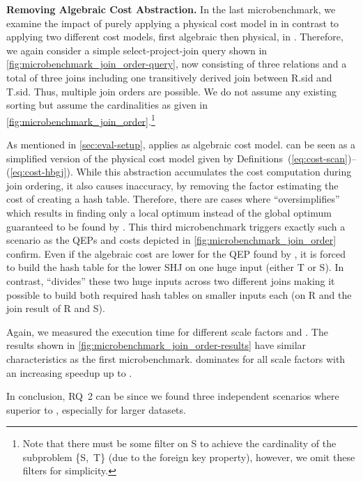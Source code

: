 \textbf{Removing Algebraic Cost Abstraction.}
In the last microbenchmark, we examine the impact of purely applying a physical cost model in \holistic in contrast to applying two different cost models, \ie first algebraic then physical, in \split.  Therefore, we again consider a simple select-project-join query shown in \autoref{fig:microbenchmark_join_order-query}, now consisting of three relations and a total of three joins including one transitively derived join between R.sid and T.sid.  Thus, multiple join orders are possible.  We do not assume any existing sorting but assume the cardinalities as given in \autoref{fig:microbenchmark_join_order}.\footnote{Note that there must be some filter on S to achieve the cardinality of the subproblem \{S,~T\} (due to the foreign key property), however, we omit these filters for simplicity.}

As mentioned in \autoref{sec:eval-setup}, \split applies \Cout as algebraic cost model.  \Cout can be seen as a simplified version of the physical cost model given by Definitions~(\ref{eq:cost-scan})--(\ref{eq:cost-hbgj}).  While this abstraction accumulates the cost computation during join ordering, it also causes inaccuracy, \eg by removing the factor estimating the cost of creating a hash table.  Therefore, there are cases where \split ``oversimplifies'' which results in finding only a local optimum instead of the global optimum guaranteed to be found by \holistic.  This third microbenchmark triggers exactly such a scenario as the QEPs and costs depicted in \autoref{fig:microbenchmark_join_order} confirm.  Even if the algebraic cost are lower for the QEP found by \split, it is forced to build the hash table for the lower SHJ on one huge input (either T or S).  In contrast, \holistic ``divides'' these two huge inputs across two different joins making it possible to build both required hash tables on smaller inputs each (on R and the join result of R and S).

Again, we measured the  execution time for different scale factors and .  The results shown in \autoref{fig:microbenchmark_join_order-results} have similar characteristics as the first microbenchmark.  \holistic dominates \split for all scale factors with an increasing speedup up to .

In conclusion, RQ~2 can be  since we found three independent scenarios where \holistic{}  superior to \split, especially for larger datasets.

